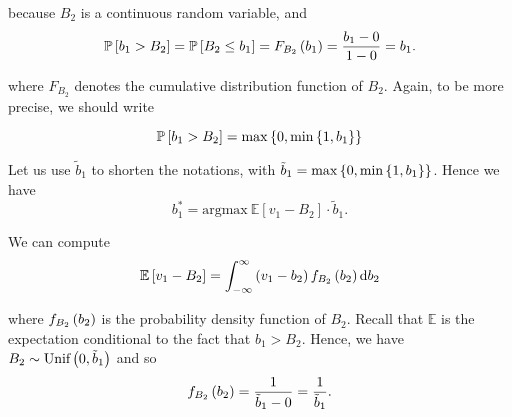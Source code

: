 because $B_2$ is a continuous random variable, and
\begin{equation*}
    \mathbb{P} \left[b_1 > B_2\right]
    = \mathbb{P} \left[B_2 \leq b_1\right]
    = F_{B_2} \left(b_1\right)
    = \dfrac{b_1 - 0}{1 - 0}
    = b_1.
\end{equation*}


where $F_{B_2}$ denotes the cumulative distribution function of $B_{2}$. Again, to be more precise, we should write

\begin{equation*}
    \mathbb{P} \left[b_1 > B_2\right] = \max \left\{0, \min \left\{1, b_1\right\}\right\}
\end{equation*}

Let us use $\tilde{b}_1$ to shorten the notations, with $\tilde{b}_1 = \max \left\{0, \min \left\{1, b_1\right\}\right\}$. Hence we have
\begin{equation*}
    b_1^{*}
    = \text{argmax} \ \mathbb{E}[v_1 - B_2] \cdot \tilde{b}_1.
\end{equation*}



We can compute
\begin{equation*}
    \mathbb{E} \left[v_1 - B_2\right]
    = \int_{- \infty}^{\infty} \left(v_1 - b_2\right) f_{B_2} \left(b_2\right) \mathrm{d} b_2
\end{equation*}

where $f_{B_2} \left(b_2\right)$ is the probability density function of $B_2$. Recall that $\mathbb{E}$ is the expectation conditional to the fact that $b_1>B_2$.  Hence, we have $B_2 \sim \text{Unif} \left(0, \tilde{b}_1\right)$ and so
\begin{equation*}
    f_{B_2} \left(b_2\right) = \dfrac{1}{\tilde{b}_1 - 0} = \dfrac{1}{\tilde{b}_1}.
\end{equation*}

